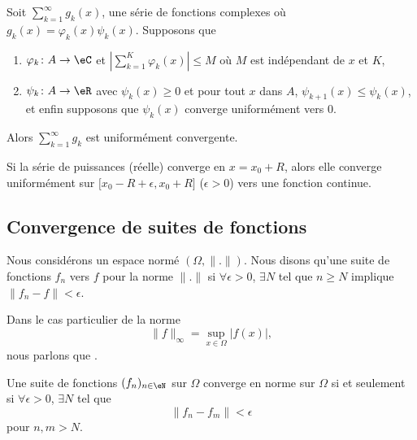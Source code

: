 \begin{theorem}				\label{ThoSerCritAbel}
	Soit $\sum_{k=1}^{\infty}g_k(x)$, une série de fonctions complexes où $g_k(x)=\varphi_k(x)\psi_k(x)$. Supposons que
	\begin{enumerate}

		\item
			$\varphi_k\colon A\to \eC$ et $| \sum_{k=1}^K\varphi_k(x) |\leq M$ où $M$ est indépendant de $x$ et $K$,
		\item
			$\psi_k\colon A\to \eR$ avec $\psi_k(x)\geq 0$ et pour tout $x$ dans $A$, $\psi_{k+1}(x)\leq \psi_k(x)$, et enfin supposons que $\psi_k(x)$ converge uniformément vers $0$.

	\end{enumerate}
	Alors $\sum_{k=1}^{\infty}g_k$ est uniformément convergente.
\end{theorem}

\begin{theorem}		\label{ThoAbelSeriePuiss}
	Si la série de puissances (réelle) converge en $x=x_0+R$, alors elle converge uniformément sur $\mathopen[ x_0-R+\epsilon , x_0+R \mathclose]$ ($\epsilon>0$) vers une fonction continue.
\end{theorem}

\subsection{Convergence de suites de fonctions}

Nous considérons un espace normé \( (\Omega,\| . \|)\). Nous disons qu'une suite de fonctions \( f_n\)  vers \( f\) pour la norme \( \| . \|\) si \( \forall \epsilon>0\), \( \exists N\) tel que \( n\geq N\) implique \( \| f_n-f \|<\epsilon\).

Dans le cas particulier de la norme 
\begin{equation}
    \| f \|_{\infty}=\sup_{x\in\Omega}| f(x) |,
\end{equation}
nous parlons que .

\begin{theorem}  \label{ThoCauchyZelUF}
    Une suite de fonctions  \( (f_n)_{n\in\eN}\) sur \( \Omega\) converge en norme sur \( \Omega\) si et seulement si \( \forall\epsilon>0\), \( \exists N\) tel que
    \begin{equation}
        \| f_n-f_m \|<\epsilon
    \end{equation}
    pour \( n,m>N\).
\end{theorem}

